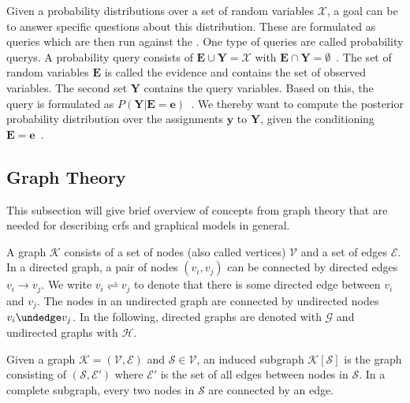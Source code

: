 Given a \glspl{probability distribution} over a set of \glspl{random variable} $\mathcal{X}$, a goal can be to answer specific questions about this distribution.
These are formulated as queries which are then run against the .
One type of queries are called \glspl{probability query}.
A \gls{probability query} consists of $\mathbf{E}\cup\mathbf{Y}=\mathcal{X}$ with $\mathbf{E}\cap\mathbf{Y}=\emptyset$~\citep{koller2009probabilistic}.
The set of \glspl{random variable} $\mathbf{E}$ is called the \gls{evidence} and contains the set of observed variables.
The second set $\mathbf{Y}$ contains the query variables.
Based on this, the query is formulated as $P(\mathbf{Y}|\mathbf{E}=\mathbf{e})$~\citep{koller2009probabilistic}.
We thereby want to compute the posterior \gls{probability distribution} over the assignments $\mathbf{y}$ to $\mathbf{Y}$, given the conditioning $\mathbf{E}=\mathbf{e}$~\citep{koller2009probabilistic}.

\subsection{Graph Theory}\label{subsec:graph-theory}

This subsection will give brief overview of concepts from graph theory that are needed for describing \glspl{crf} and graphical models in general.

\bigskip

A \gls{graph} $\mathcal{K}$ consists of a set of \glspl{node} (also called vertices) $\mathcal{V}$ and a set of \glspl{edge} $\mathcal{E}$.
In a directed \gls{graph}, a pair of \glspl{node} $(v_i,v_j)$ can be connected by directed \glspl{edge} $v_i\to v_j$.
We write $v_i\rightleftharpoons v_j$ to denote that there is some directed edge between $v_i$ and $v_j$.
The \glspl{node} in an undirected graph are connected by undirected \glspl{node} $v_i\undedge v_j$.
In the following, directed \glspl{graph} are denoted with $\mathcal{G}$ and undirected \glspl{graph} with $\mathcal{H}$.

Given a \gls{graph} $\mathcal{K} = (\mathcal{V},\mathcal{E})$ and $\mathcal{S}\in\mathcal{V}$, an induced \gls{subgraph} $\mathcal{K}[\mathcal{S}]$ is the \gls{graph} consisting of $(\mathcal{S},\mathcal{E'})$ where $\mathcal{E'}$ is the set of all \glspl{edge} between \glspl{node} in $\mathcal{S}$.
In a complete \gls{subgraph}, every two \glspl{node} in $\mathcal{S}$ are connected by an \gls{edge}.

